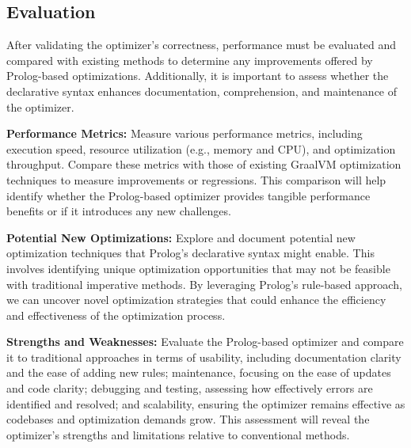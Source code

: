 \subsection{Evaluation}
After validating the optimizer's correctness, performance must be evaluated and compared with existing methods to determine any improvements offered by Prolog-based optimizations. Additionally, it is important to assess whether the declarative syntax enhances documentation, comprehension, and maintenance of the optimizer.
\begin{description}
    \item \textbf{Performance Metrics:} Measure various performance metrics, including execution speed, resource utilization (e.g., memory and CPU), and optimization throughput. Compare these metrics with those of existing GraalVM optimization techniques to measure improvements or regressions. This comparison will help identify whether the Prolog-based optimizer provides tangible performance benefits or if it introduces any new challenges.
    \item \textbf{Potential New Optimizations:} Explore and document potential new optimization techniques that Prolog's declarative syntax might enable. This involves identifying unique optimization opportunities that may not be feasible with traditional imperative methods. By leveraging Prolog’s rule-based approach, we can uncover novel optimization strategies that could enhance the efficiency and effectiveness of the optimization process.
    \item \textbf{Strengths and Weaknesses:} Evaluate the Prolog-based optimizer and compare it to traditional approaches in terms of usability, including documentation clarity and the ease of adding new rules; maintenance, focusing on the ease of updates and code clarity; debugging and testing, assessing how effectively errors are identified and resolved; and scalability, ensuring the optimizer remains effective as codebases and optimization demands grow. This assessment will reveal the optimizer’s strengths and limitations relative to conventional methods.
\end{description}

\newpage

